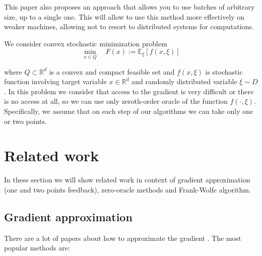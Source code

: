 \documentclass{article}
\begin{document}
    This paper also proposes an approach that allows you to use batches of arbitrary size, up to a single one. This will allow to use this method more effectively on weaker machines, allowing not to resort to distributed systems for computations. 

    We consider convex stochastic minimization problem
    \begin{equation}
        \label{main_problem}
        \underset{x \in Q}{\min} \quad F(x) := 
        \mathbb{E}_{\xi}\left[f(x, \xi)\right]
    \end{equation}

    where $Q \subset \mathbb{R}^d$ is a convex and compact feasible set and $f(x, \xi)$ is stochastic function involving target variable $x \in \mathbb{R}^d$ and randomly distributed variable $\xi \sim D$. In this problem we consider that access to the gradient is very difficult or there is no access at all, so we can use only zeroth-order oracle of the function $f(\cdot, \xi)$. Specifically, we assume that on each step of our algorithms we can take only one or two points.

\section{Related work} \label{Related_work}

    In these section we will show related work in context of gradient approximation (one and two points feedback), zero-oracle methods and Frank-Wolfe algorithm.

    \subsection{Gradient approximation}\label{Gradient_approximation}
    
        There are a lot of papers about how to approximate the gradient \cite{ermoliev1976methods, nemirovskij1983problem, agarwal2010optimal, agarwal2011stochastic}. The most popular methods are:
    
\end{document}
